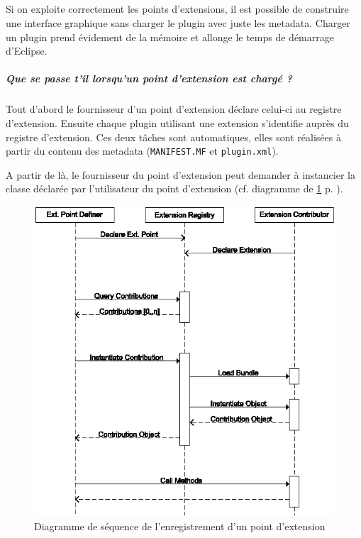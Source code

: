\subparagraph*{}
Si on exploite correctement les points d'extensions, il est possible de construire une interface graphique sans charger le plugin avec juste les metadata. 
Charger un plugin prend évidement de la mémoire et allonge le temps de démarrage d'Eclipse.

\subparagraph{Que se passe t'il lorsqu'un point d'extension est chargé ?}
Tout d'abord le fournisseur d'un point d'extension déclare celui-ci au registre d'extension.
Ensuite chaque plugin utilisant une extension s'identifie auprès du registre d'extension. Ces deux tâches sont automatiques, elles sont réalisées à partir du contenu des metadata (\texttt{MANIFEST.MF} et \texttt{plugin.xml}).

A partir de là, le fournisseur du point d'extension peut demander à instancier la classe déclarée par l'utilisateur du point d'extension (cf. diagramme de \ref{extension_point_sequence} p. \pageref{extension_point_sequence}).

\begin{figure}[!ht]
\begin{center}
  \includegraphics[scale=.7]{images/extension_sequense_diagram.png}
  \caption{Diagramme de séquence de l'enregistrement d'un point d'extension}
  \label{extension_point_sequence}
\end{center}
\end{figure}

